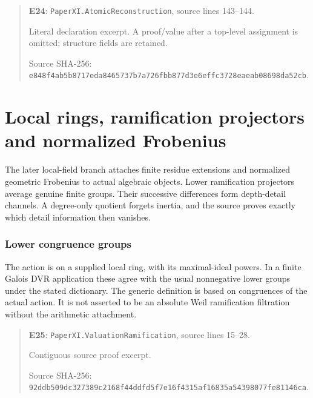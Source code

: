 \documentclass[10pt,oneside]{book}
\begin{document}
\begin{quote}\footnotesize\textbf{E24}: \nolinkurl{PaperXI.AtomicReconstruction}, source lines 143--144.\par Literal declaration excerpt. A proof/value after a top-level assignment is omitted; structure fields are retained.\par Source SHA-256: {\scriptsize\texttt{e848f4ab5b8717eda8465737b7a726fbb877d3e6effc3728eaeab08698da52cb}}.\end{quote}


\chapter{Local rings, ramification projectors and normalized Frobenius}
The later local-field branch attaches finite residue extensions and normalized geometric Frobenius to actual algebraic objects. Lower ramification projectors average genuine finite groups. Their successive differences form depth-detail channels. A degree-only quotient forgets inertia, and the source proves exactly which detail information then vanishes.

\subsection{Lower congruence groups}
\label{guide:E25}
The action is on a supplied local ring, with its maximal-ideal powers. In a finite Galois DVR application these agree with the usual nonnegative lower groups under the stated dictionary.
The generic definition is based on congruences of the actual action. It is not asserted to be an absolute Weil ramification filtration without the arithmetic attachment.

\begin{quote}\footnotesize\textbf{E25}: \nolinkurl{PaperXI.ValuationRamification}, source lines 15--28.\par Contiguous source proof excerpt.\par Source SHA-256: {\scriptsize\texttt{92ddb509dc327389c2168f44ddfd5f7e16f4315af16835a54398077fe81146ca}}.\end{quote}

\end{document}
